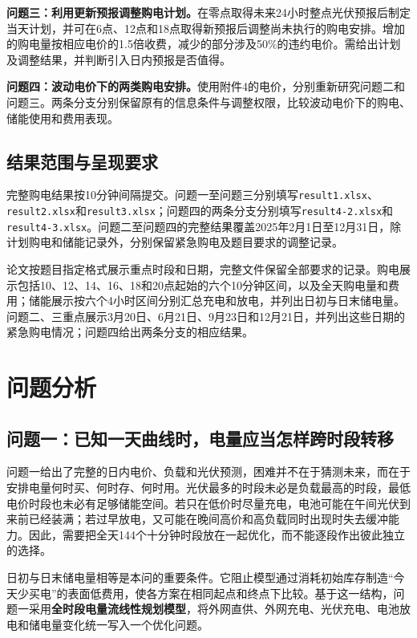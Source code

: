\textbf{问题三：利用更新预报调整购电计划。}在零点取得未来24小时整点光伏预报后制定当天计划，并可在6点、12点和18点取得新预报后调整尚未执行的购电安排。增加的购电量按相应电价的1.5倍收费，减少的部分涉及50\%的违约电价。需给出计划及调整结果，并判断引入日内预报是否值得。

\textbf{问题四：波动电价下的两类购电安排。}使用附件4的电价，分别重新研究问题二和问题三。两条分支分别保留原有的信息条件与调整权限，比较波动电价下的购电、储能使用和费用表现。

\subsection{结果范围与呈现要求}
完整购电结果按10分钟间隔提交。问题一至问题三分别填写\texttt{result1.xlsx}、\texttt{result2.xlsx}和\texttt{result3.xlsx}；问题四的两条分支分别填写\texttt{result4-2.xlsx}和\texttt{result4-3.xlsx}。问题二至问题四的完整结果覆盖2025年2月1日至12月31日，除计划购电和储能记录外，分别保留紧急购电及题目要求的调整记录。

论文按题目指定格式展示重点时段和日期，完整文件保留全部要求的记录。购电展示包括10、12、14、16、18和20点起始的六个10分钟区间，以及全天购电量和费用；储能展示按六个4小时区间分别汇总充电和放电，并列出日初与日末储电量。问题二、三重点展示3月20日、6月21日、9月23日和12月21日，并列出这些日期的紧急购电情况；问题四给出两条分支的相应结果。

\section{问题分析}

\subsection{问题一：已知一天曲线时，电量应当怎样跨时段转移}

问题一给出了完整的日内电价、负载和光伏预测，困难并不在于猜测未来，而在于安排电量何时买、何时存、何时用。光伏最多的时段未必是负载最高的时段，最低电价时段也未必有足够储能空间。若只在低价时尽量充电，电池可能在午间光伏到来前已经装满；若过早放电，又可能在晚间高价和高负载同时出现时失去缓冲能力。因此，需要把全天144个十分钟时段放在一起优化，而不能逐段作出彼此独立的选择。

日初与日末储电量相等是本问的重要条件。它阻止模型通过消耗初始库存制造“今天少买电”的表面低费用，使各方案在相同起点和终点下比较。基于这一结构，问题一采用\textbf{全时段电量流线性规划模型}，将外网直供、外网充电、光伏充电、电池放电和储电量变化统一写入一个优化问题。

